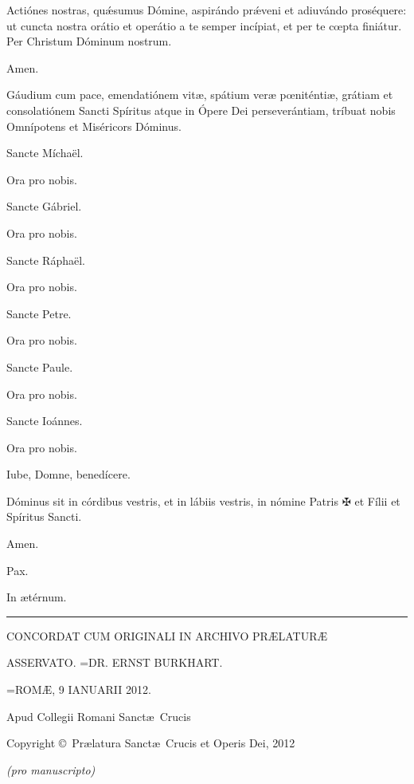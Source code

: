 \begin{multicols}{2}
 Actiónes nostras, qu\'\ae sumus Dómine, aspirándo pr\'\ae veni et adiuvándo proséquere: ut cuncta nos\-tra orátio et operátio a te semper incípiat, et per te c\oe pta finiátur. Per Christum Dóminum nostrum.
 
 \ra Amen.
 
\bigskip
{}
 
 Gáudium cum pace, emendatiónem vitæ, spátium ver\ae{}  p\oe niténti\ae{}, grátiam et consolatiónem Sancti Spíritus atque in Ópere Dei perseverántiam, tríbuat nobis Omnípotens et Miséricors Dóminus.
 
\bigskip
 \va  Sancte Míchaël.
 
 \ra Ora pro nobis.
 
\bigskip
 \va  Sancte Gábriel.
 
 \ra Ora pro nobis.
 
\bigskip
 \va  Sancte Ráphaël.
 
 \ra Ora pro nobis.
 
\bigskip
 \va  Sancte Petre.
 
 \ra Ora pro nobis.
 
\bigskip
 \va  Sancte Paule.
 
 \ra Ora pro nobis.
 
\bigskip
 \va  Sancte Ioánnes.
 
 \ra Ora pro nobis.
 
\bigskip
 
 Iube, Domne, benedícere.
 
 \medskip
 
 Dóminus sit in córdibus vestris, et in lábiis vestris, in nómine Patris {\color{rubrica} $\maltese$} et Fílii et Spíritus Sancti.
 
 \ra Amen.
 
\bigskip
 \va  Pax.
 
 \ra In ætérnum.

\end{multicols}

\vfill

\begin{center}
\rule{40mm}{0.1mm}

\bigskip

{\small CONCORDAT CUM ORIGINALI IN ARCHIVO PRÆLATURÆ

ASSERVATO. =DR. ERNST BURKHART.

=ROMÆ, 9 IANUARII 2012.

\bigskip

 Apud Collegii Romani Sanct\ae \ Crucis

Copyright \copyright \  Pr\ae latura Sanct\ae \ Crucis et Operis Dei, 2012

\emph{(pro manuscripto)}}

\end{center}
